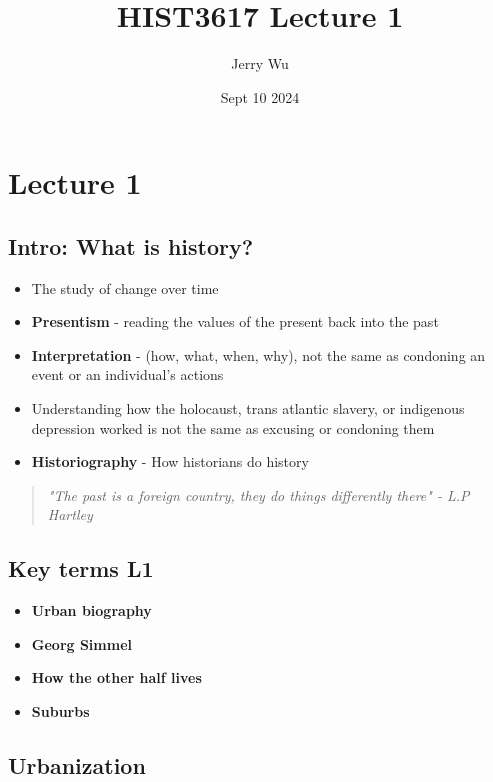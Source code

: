 \documentclass[12pt]{book}
\title{HIST3617 Lecture 1}
\author{Jerry Wu}
\date{Sept 10 2024}
\begin{document}
\maketitle

\tableofcontents

\chapter{Lecture 1}

\section{Intro: What is history?}

\begin{itemize}
    \item The study of change over time
    \item \textbf{Presentism} - reading the values of the present back into the past
    \item \textbf{Interpretation} - (how, what, when, why), not the same as condoning an event or an individual's actions
    \item Understanding how the holocaust, trans atlantic slavery, or indigenous depression worked is not the same as excusing or condoning them
    \item \textbf{Historiography} - How historians do history
\end{itemize}

\begin{quote}
    \textit{"The past is a foreign country, they do things differently there" - L.P Hartley}
\end{quote}

\section{Key terms L1}

\begin{itemize}
    \item \textbf{Urban biography}
    \item \textbf{Georg Simmel}
    \item \textbf{How the other half lives}
    \item \textbf{Suburbs}
\end{itemize}

\section{Urbanization}
\end{document}
